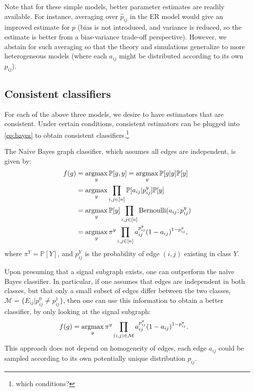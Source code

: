 \documentclass[10pt,journal,cspaper,compsoc]{IEEEtran}
\providecommand{\mc}[1]{\mathcal{#1}}
\providecommand{\mh}[1]{\hat{#1}}
\newcommand{\PP}{\mathbb{P}}
\newcommand{\argmax}{\operatornamewithlimits{argmax}}
\begin{document}
Note that for these simple models, better parameter estimates are readily available.  For instance, averaging over $\mh{p}_{ij}$ in the ER model would give an improved estimate for $p$ (bias is not introduced, and variance is reduced, so the estimate is better from a bias-variance trade-off perspective).  However, we abstain for such averaging so that the theory and simulations generalize to more heterogeneous models (where each $a_{ij}$ might be distributed according to its own $p_{ij}$).




\subsection{Consistent classifiers} %
\label{sub:model_based_consistent_classifiers}


For each of the above three models, we desire to have estimators that are consistent.  Under certain conditions, consistent estimators can be plugged into \eqref{eq:bayes} to obtain consistent classifiers.\footnote{which conditions?}  

The Na\"{i}ve Bayes graph classifier, which assumes all edges are independent, is given by:
\begin{align} \label{eq:nb}
	f(g) &= \argmax_y \PP[g,y] = \argmax_y \PP[g|y] \PP[y] 
	\nonumber \\&= \argmax_y \prod_{i,j\in[n]} \PP[a_{ij} | p_{ij}^y] \PP[y]
	\nonumber \\&= \argmax_y \PP[y] \prod_{i,j\in[n]} \text{Bernoulli}(a_{ij}; p_{ij}^y) 
	\nonumber \\&= \argmax_y \pi^y \prod_{i,j\in[n]} a_{ij}^{p_{ij}^y} (1-a_{ij})^{1-p_{ij}^y}, 
\end{align}
where $\pi^Y=\PP[Y]$, and  $p_{ij}^Y$ is the probability of edge $(i,j)$ existing in class $Y$.  

Upon presuming that a signal subgraph exists, one can outperform the na\"{i}ve Bayes classifier.  In particular, if one assumes that edges are independent in both classes, but that only a small subset of edges differ between the two classes, $\mc{M}=\{E_{ij} | p_{ij}^0 \neq p_{ij}^1\}$, then one can use this information to obtain a better classifier, by only looking at the signal subgraph:
\begin{align} \label{eq:subgraph}
	f(g) &= \argmax_y \pi^y \prod_{(i,j) \in \mc{M}} a_{ij}^{p_{ij}^y} (1-a_{ij})^{1-p_{ij}^y}.
\end{align}
This approach does not depend on homogeneity of edges, each edge $a_{ij}$ could be sampled according to its own potentially unique distribution $p_{ij}$.  
\end{document}
